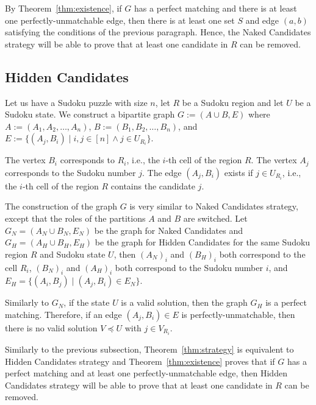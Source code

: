 By Theorem~\ref{thm:existence},
if $G$ has a perfect matching and there is at least one perfectly-unmatchable edge,
then there is at least one set $S$ and edge $(a, b)$ satisfying the conditions of the previous paragraph.
Hence, the Naked Candidates strategy will be able to prove that at least one candidate in $R$ can be removed.

\subsection*{Hidden Candidates}

Let us have a Sudoku puzzle with size $n$, let $R$ be a Sudoku region and let $U$ be a Sudoku state.
We construct a bipartite graph $G := (A \cup B, E)$ where
$A := (A_1, A_2, \dots, A_n)$, $B := (B_1, B_2, \dots, B_n)$, and
$E := \{(A_j, B_i) \mid i, j \in [n] \land j \in U_{R_i}\}$.

The vertex $B_i$ corresponds to $R_i$, i.e., the $i$-th cell of the region $R$.
The vertex $A_j$ corresponds to the Sudoku number $j$.
The edge $(A_j, B_i)$ exists if $j \in U_{R_i}$, i.e., the $i$-th cell of the region $R$ contains the candidate $j$.

The construction of the graph $G$ is very similar to Naked Candidates strategy,
except that the roles of the partitions $A$ and $B$ are switched.
Let $G_N = (A_N \cup B_N, E_N)$ be the graph for Naked Candidates
and $G_H = (A_H \cup B_H, E_H)$ be the graph for Hidden Candidates
for the same Sudoku region $R$ and Sudoku state $U$,
then $(A_N)_i$ and $(B_H)_i$ both correspond to the cell $R_i$,
$(B_N)_i$ and $(A_H)_i$ both correspond to the Sudoku number $i$, and
$E_H = \{(A_i, B_j) \mid (A_j, B_i) \in E_N\}$.


Similarly to $G_N$, if the state $U$ is a valid solution, then the graph $G_H$ is a perfect matching.
Therefore, if an edge $(A_j, B_i) \in E$ is perfectly-unmatchable,
then there is no valid solution $V \preceq U$ with $j \in V_{R_i}$.

Similarly to the previous subsection,
Theorem~\ref{thm:strategy} is equivalent to Hidden Candidates strategy and
Theorem~\ref{thm:existence} proves that if $G$ has a perfect matching and at least one perfectly-unmatchable edge,
then Hidden Candidates strategy will be able to prove that at least one candidate in $R$ can be removed.

